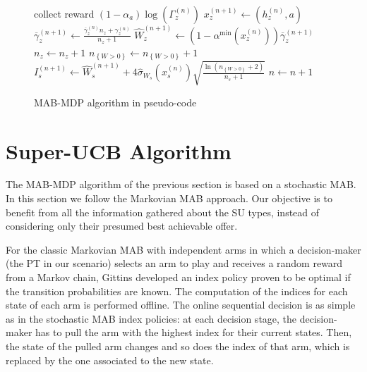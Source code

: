 \begin{figure}
\begin{algorithmic}[1]
    \ELSE
      \STATE collect reward $(1-\alpha_a)\log(\Gamma_z^{(n)})$
      \STATE $x_z^{(n+1)} \leftarrow (h_z^{(n)},a)$
      \STATE $\overline{\gamma}_{z}^{(n+1)} \leftarrow \frac{\overline{\gamma}_{z}^{(n)}n_z+\gamma_z^{(n)}}{n_z+1}$  
      \STATE $\widehat{W}_z^{(n+1)}\leftarrow (1-\alpha^{\text{min}}(x_z^{(n)}))\overline{\gamma}_z^{(n+1)}$
      \STATE $n_z \leftarrow n_z + 1$
      \STATE $n_{\left\{W>0\right\}} \leftarrow n_{\left\{W>0\right\}} + 1$
        \STATE $I_{s}^{(n+1)} \leftarrow \widehat{W}_{s}^{(n+1)} + 4\hat\sigma_{W_s}(x_s^{(n)}) \sqrt{\frac{\ln(n_{\left\{W>0\right\}} + 2)}{n_s+1}}$
      \ENDFOR
    \ENDIF
    \STATE $n \leftarrow n + 1$
  \ENDLOOP
\end{algorithmic}
\caption{MAB-MDP algorithm in pseudo-code}
\label{code:TLP}
\end{figure}

\section{Super-UCB Algorithm}\label{sec:Super}
The MAB-MDP algorithm of the previous section is based on a stochastic MAB. In this section we follow the Markovian MAB approach. Our objective is to benefit from all the information gathered about the SU types, instead of considering only their presumed best achievable offer.

For the classic Markovian MAB with independent arms in which a decision-maker (the PT in our scenario) selects an arm to play and receives a random reward from a Markov chain, Gittins \cite{ref:Gittins2011} developed an index policy proven to be optimal if the transition probabilities are known.
The computation of the indices for each state of each arm is performed offline. 
The online sequential decision is as simple as in the stochastic MAB index policies: at each decision stage, the decision-maker has to pull the arm with the highest index for their current states. 
Then, the state of the pulled arm changes and so does the index of that arm, which is replaced by the one associated to the new state. 

